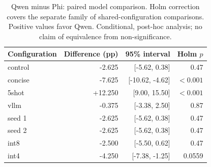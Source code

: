 \begin{table}[tbp]
\centering\small
\caption{Qwen minus Phi: paired model comparison. Holm correction covers the separate family of shared-configuration comparisons. Positive values favor Qwen. Conditional, post-hoc analysis; no claim of equivalence from non-significance.}\label{tab:h2h}
\begin{tabular}{lrrr}\toprule
Configuration & Difference (pp) & 95\% interval & Holm $p$ \\
\midrule
control & -2.625 & [-5.62, 0.38] & 0.47 \\
concise & -7.625 & [-10.62, -4.62] & $<0.001$ \\
5shot & +12.250 & [9.00, 15.50] & $<0.001$ \\
vllm & -0.375 & [-3.38, 2.50] & 0.87 \\
seed 1 & -2.625 & [-5.62, 0.38] & 0.47 \\
seed 2 & -2.625 & [-5.62, 0.38] & 0.47 \\
int8 & -2.500 & [-5.50, 0.62] & 0.47 \\
int4 & -4.250 & [-7.38, -1.25] & 0.0559 \\
\bottomrule\end{tabular}
\end{table}

